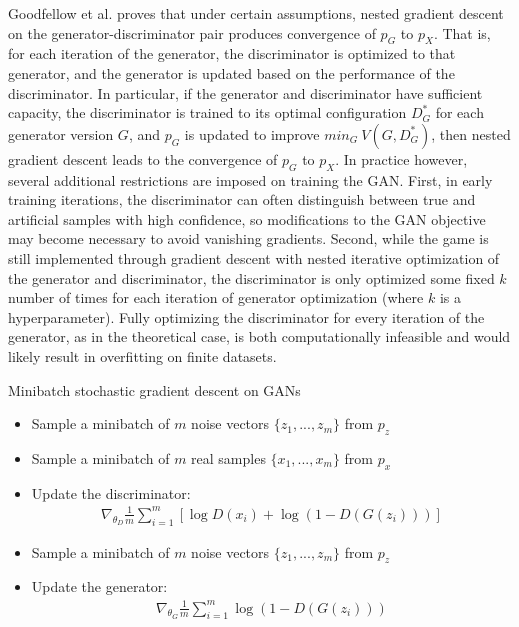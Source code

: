 \documentclass[submission]{eptcs}
\begin{document}
Goodfellow et al. proves that under certain assumptions, nested gradient descent on the generator-discriminator pair produces convergence of $p_G$ to $p_X$. That is, for each iteration of the generator, the discriminator is optimized to that generator, and the generator is updated based on the performance of the discriminator. In particular, if the generator and discriminator have sufficient capacity, the discriminator is trained to its optimal configuration $D^*_G$ for each generator version $G$, and $p_G$ is updated to improve $min_G \ V(G, D^*_G)$, then nested gradient descent leads to the convergence of $p_G$ to $p_X$. In practice however, several additional restrictions are imposed on training the GAN. First, in early training iterations, the discriminator can often distinguish between true and artificial samples with high confidence, so modifications to the GAN objective may become necessary to avoid vanishing gradients. Second, while the game is still implemented through gradient descent with nested iterative optimization of the generator and discriminator, the discriminator is only optimized some fixed $k$ number of times for each iteration of generator optimization (where $k$ is a hyperparameter). Fully optimizing the discriminator for every iteration of the generator, as in the theoretical case, is both computationally infeasible and would likely result in overfitting on finite datasets. \\

\begin{algorithm}[H]
    \caption{Minibatch stochastic gradient descent on GANs}
    \begin{algorithmic}
                \begin{itemize}
                    \setlength\itemindent{25pt}
                    \item Sample a minibatch of $m$ noise vectors $\{z_1, ..., z_m\}$ from $p_z$
                    \item Sample a minibatch of $m$ real samples $\{x_1, ..., x_m\}$ from $p_x$
                    \item Update the discriminator: 
                    \begin{align}
                        \nabla_{\theta_D} \frac{1}{m} \sum_{i=1}^{m} \left[\log D(x_i) + \log(1 - D(G(z_i)))\right]
                    \end{align}
                \end{itemize}
            \EndFor
            \begin{itemize}
                \item Sample a minibatch of $m$ noise vectors $\{z_1, ..., z_m\}$ from $p_z$
                \item Update the generator: 
                \begin{align}
                    \nabla_{\theta_G} \frac{1}{m} \sum_{i=1}^{m} \log(1 - D(G(z_i)))
                \end{align}
            \end{itemize}
        \EndFor
    \end{algorithmic}
\end{algorithm}
\end{document}

